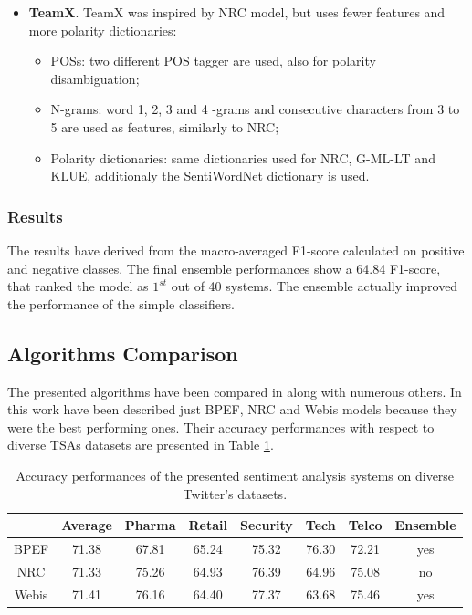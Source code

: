 \begin{itemize}
	
	\item \textbf{TeamX}. TeamX \cite{teamx} was inspired by NRC model, but uses fewer features and more polarity dictionaries:
	\begin{itemize}
		\item \aclp{POS}: two different \ac{POS} tagger are used, also for polarity disambiguation;
		\item N-grams: word 1, 2, 3 and 4 -grams and consecutive characters from 3 to 5 are used as features, similarly to NRC;
		\item Polarity dictionaries: same dictionaries used for NRC, G-ML-LT and KLUE, additionaly the SentiWordNet dictionary is used.
	\end{itemize}
\end{itemize}

\subsubsection{Results}

The results have derived from the macro-averaged F1-score calculated on positive and negative classes. The final ensemble performances show a 64.84 F1-score, that ranked the model as $1^{st}$ out of 40 systems. The ensemble actually improved the performance of the simple classifiers.



\subsection{Algorithms Comparison}

The presented algorithms have been compared in \cite{Zimbra:2018:STS:3210372.3185045} along with numerous others. In this work have been described just BPEF, NRC and Webis models because they were the best performing ones. Their accuracy performances with respect to diverse \aclp{TSA} datasets are presented in Table \ref{table:perf-presented-alg}.

\begin{table}[H]
	\centering
	\begin{tabular}{ | c || c  c  c  c  c  c | c | }
		\hline
		 & Average & Pharma & Retail & Security & Tech & Telco & Ensemble\\
		\hline
		BPEF & 71.38 & 67.81 & 65.24 & 75.32 & 76.30 & 72.21 & yes\\
		\hline
		NRC & 71.33 & 75.26 & 64.93 & 76.39 & 64.96 & 75.08 & no\\
		\hline
		Webis & 71.41 & 76.16 & 64.40 & 77.37 & 63.68 & 75.46 & yes\\
		\hline
	\end{tabular}
	\caption{Accuracy performances of the presented sentiment analysis systems on diverse Twitter's datasets.}
	\label{table:perf-presented-alg}
\end{table}

